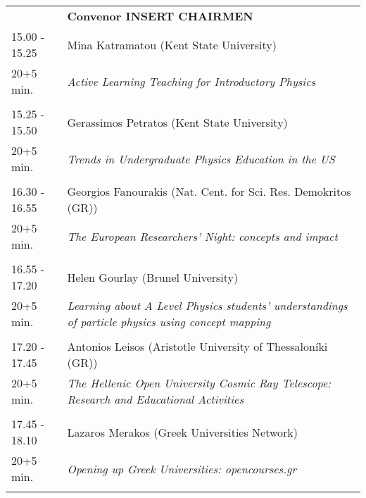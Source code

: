 \begin{longtable}{p{3cm}p{13cm}}
&\hfill {\bf Convenor INSERT CHAIRMEN }\\ 
15.00 - 15.25 & Mina Katramatou (Kent State University)\\ 
20+5 min. & {\it Active Learning Teaching for Introductory Physics}\\ 
 & \\ 
15.25 - 15.50 & Gerassimos Petratos (Kent State University)\\ 
20+5 min. & {\it Trends in Undergraduate Physics Education in the US}\\ 
 & \\ 
16.30 - 16.55 & Georgios Fanourakis (Nat. Cent. for Sci. Res. Demokritos (GR))\\ 
20+5 min. & {\it The European Researchers' Night: concepts and impact}\\ 
 & \\ 
16.55 - 17.20 & Helen Gourlay (Brunel University)\\ 
20+5 min. & {\it Learning about A Level Physics students’ understandings of particle physics using concept mapping}\\ 
 & \\ 
17.20 - 17.45 & Antonios Leisos (Aristotle University of Thessaloníki (GR))\\ 
20+5 min. & {\it The Hellenic Open University Cosmic Ray Telescope: Research and Educational Activities}\\ 
 & \\ 
17.45 - 18.10 & Lazaros Merakos (Greek Universities Network)\\ 
20+5 min. & {\it Opening up Greek Universities: opencourses.gr}\\ 
 & \\ 
\end{longtable}

